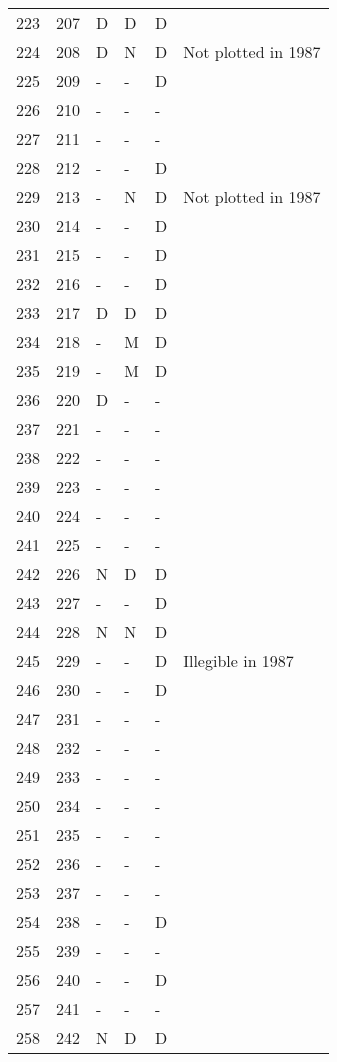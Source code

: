 \documentclass[10pt]{article}
\begin{document}
\begin{longtable}{llllll}
  223 & 207 & D & D & D &  \\ 
  224 & 208 & D & N & D & Not plotted in 1987 \\ 
  225 & 209 & - & - & D &  \\ 
  226 & 210 & - & - & - &  \\ 
  227 & 211 & - & - & - &  \\ 
  228 & 212 & - & - & D &  \\ 
  229 & 213 & - & N & D & Not plotted in 1987 \\ 
  230 & 214 & - & - & D &  \\ 
  231 & 215 & - & - & D &  \\ 
  232 & 216 & - & - & D &  \\ 
  233 & 217 & D & D & D &  \\ 
  234 & 218 & - & M & D &  \\ 
  235 & 219 & - & M & D &  \\ 
  236 & 220 & D & - & - &  \\ 
  237 & 221 & - & - & - &  \\ 
  238 & 222 & - & - & - &  \\ 
  239 & 223 & - & - & - &  \\ 
  240 & 224 & - & - & - &  \\ 
  241 & 225 & - & - & - &  \\ 
  242 & 226 & N & D & D &  \\ 
  243 & 227 & - & - & D &  \\ 
  244 & 228 & N & N & D &  \\ 
  245 & 229 & - & - & D & Illegible in 1987 \\ 
  246 & 230 & - & - & D &  \\ 
  247 & 231 & - & - & - &  \\ 
  248 & 232 & - & - & - &  \\ 
  249 & 233 & - & - & - &  \\ 
  250 & 234 & - & - & - &  \\ 
  251 & 235 & - & - & - &  \\ 
  252 & 236 & - & - & - &  \\ 
  253 & 237 & - & - & - &  \\ 
  254 & 238 & - & - & D &  \\ 
  255 & 239 & - & - & - &  \\ 
  256 & 240 & - & - & D &  \\ 
  257 & 241 & - & - & - &  \\ 
  258 & 242 & N & D & D &  \\ 

\end{longtable}
\end{document}
